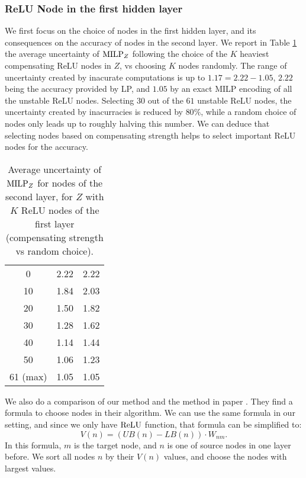 \subsubsection*{ReLU Node in the first hidden layer}


We first focus on the choice of nodes in the first hidden layer, and its consequences on the accuracy of nodes in the second layer. 
We report in Table \ref{tab:example0} the average uncertainty of ${\textrm{MILP}}_Z$ following the choice of the $K$ heaviest compensating ReLU nodes in $Z$, vs choosing $K$ nodes randomly. The range of uncertainty created by inacurate computations is up to $1.17=2.22-1.05$, $2.22$ being the accuracy provided by LP, and $1.05$ by an exact MILP encoding of all the unstable ReLU nodes. Selecting $30$ out of the $61$ unstable ReLU nodes, the uncertainty created by inacurracies is reduced by $80\%$, while a random choice of nodes only leads up to roughly halving this number. We can deduce that selecting nodes based on compensating strength helps to select important ReLU nodes for the accuracy.



\begin{table}[h!]
	\centering
	\begin{tabular}{|c||c|c|}
		\hline
		\text{Number $K$ of nodes in $Z$}  &  \text{Compensate strength} & \text{Random Choice}  \\ \hline
		\hline
		0  &  2.22 & 2.22  \\ \hline
		10  &  1.84 & 2.03  \\ \hline
		20  &  1.50 & 1.82  \\ \hline
		30  &  1.28 & 1.62  \\ \hline
		40  &  1.14 & 1.44  \\ \hline
		50  &  1.06 & 1.23  \\ \hline
		61 (max) & 1.05 &  1.05 \\ \hline
	\end{tabular}
	\caption{Average uncertainty of ${\textrm{MILP}}_Z$ for nodes of the second layer, for $Z$ with $K$ ReLU nodes of the first layer (compensating strength vs random choice).}
	\label{tab:example0}
\end{table}


{\color{red} We also do a comparison of our method and the method in paper \cite{9211410}. They find a formula to choose nodes in their algorithm. We can use the same formula in our setting, and since we only have $\mathrm{ReLU}$ function, that formula can be simplified to: $$V(n) = (UB(n)-LB(n))\cdot W_{nm}.$$ In this formula, $m$ is the target node, and $n$ is one of source nodes in one layer before. We sort all nodes $n$ by their $V(n)$ values, and choose the nodes with largest values.}

